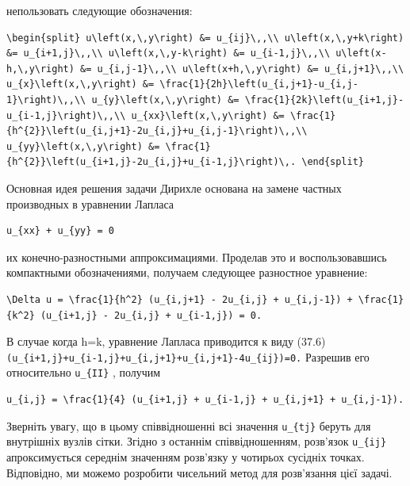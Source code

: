 \documentclass[
  ukrainian,
]{article}
\begin{document}
непользовать следующие обозначения:

\begin{verbatim}
\begin{split} u\left(x,\,y\right) &= u_{ij}\,,\\ u\left(x,\,y+k\right) &= u_{i+1,j}\,,\\ u\left(x,\,y-k\right) &= u_{i-1,j}\,,\\ u\left(x-h,\,y\right) &= u_{i,j-1}\,,\\ u\left(x+h,\,y\right) &= u_{i,j+1}\,,\\ u_{x}\left(x,\,y\right) &= \frac{1}{2h}\left(u_{i,j+1}-u_{i,j-1}\right)\,,\\ u_{y}\left(x,\,y\right) &= \frac{1}{2k}\left(u_{i+1,j}-u_{i-1,j}\right)\,,\\ u_{xx}\left(x,\,y\right) &= \frac{1}{h^{2}}\left(u_{i,j+1}-2u_{i,j}+u_{i,j-1}\right)\,,\\ u_{yy}\left(x,\,y\right) &= \frac{1}{h^{2}}\left(u_{i+1,j}-2u_{i,j}+u_{i-1,j}\right)\,. \end{split}
\end{verbatim}

Основная идея решения задачи Дирихле основана на замене частных
производных в уравнении Лапласа

\begin{verbatim}
u_{xx} + u_{yy} = 0
\end{verbatim}

их конечно-разностными аппроксимациями. Проделав это и воспользовавшись
компактными обозначениями, получаем следующее разностное уравнение:

\begin{verbatim}
\Delta u = \frac{1}{h^2} (u_{i,j+1} - 2u_{i,j} + u_{i,j-1}) + \frac{1}{k^2} (u_{i+1,j} - 2u_{i,j} + u_{i-1,j}) = 0.
\end{verbatim}

В случае когда h=k, уравнение Лапласа приводится к виду (37.6)
\texttt{(u\_\{i+1,j\}+u\_\{i-1,j\}+u\_\{i,j+1\}+u\_\{i,j+1\}-4u\_\{ij\})=0.}
Разрешив его относительно \texttt{u\_\{II\}} , получим

\begin{verbatim}
u_{i,j} = \frac{1}{4} (u_{i+1,j} + u_{i-1,j} + u_{i,j+1} + u_{i,j-1}).
\end{verbatim}

Зверніть увагу, що в цьому співвідношенні всі значення
\texttt{u\_\{tj\}} беруть для внутрішніх вузлів сітки. Згідно з останнім
співвідношенням, розв'язок \texttt{u\_\{ij\}} апроксимується середнім
значенням розв'язку у чотирьох сусідніх точках. Відповідно, ми можемо
розробити чисельний метод для розв'язання цієї задачі.
\end{document}
